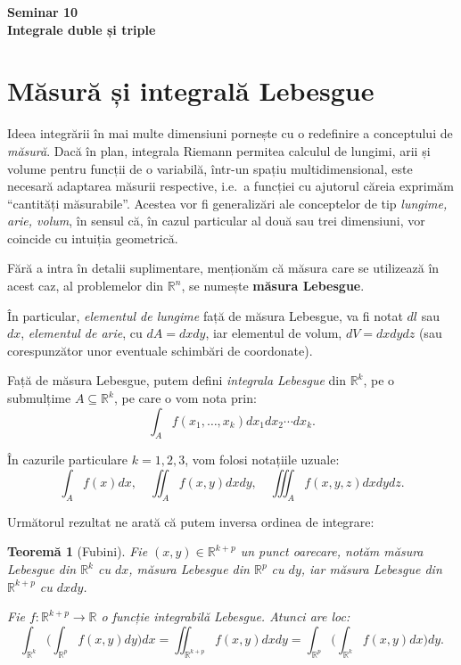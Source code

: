 \documentclass[11pt,a4paper]{article}
\newcommand\seq{\subseteq}
\newcommand\RR{\mathbb{R}}
\theoremstyle{dotless}
\newtheorem{theorem}{Teorem\u{a}}[section]
\theoremstyle{dotlessdr}
\begin{document}
\begin{center}
  {\large\textbf{Seminar 10 \\ Integrale duble și triple}}
\end{center}

\vspace{1cm}

\section{Măsură și integrală Lebesgue}
\label{sec:int-leb}

Ideea integrării în mai multe dimensiuni pornește cu o redefinire a conceptului
de \emph{măsură}. Dacă în plan, integrala Riemann permitea calculul de lungimi,
arii și volume pentru funcții de o variabilă, într-un spațiu multidimensional,
este necesară adaptarea măsurii respective, i.e.\ a funcției cu ajutorul căreia
exprimăm ``cantități măsurabile''. Acestea vor fi generalizări ale conceptelor
de tip \emph{lungime, arie, volum}, în sensul că, în cazul particular al două
sau trei dimensiuni, vor coincide cu intuiția geometrică.

Fără a intra în detalii suplimentare, menționăm că măsura care se utilizează
în acest caz, al problemelor din $\RR^n$, se numește \textbf{măsura Lebesgue}.

În particular, \emph{elementul de lungime} față de măsura Lebesgue, va fi notat
$dl$ sau $dx$, \emph{elementul de arie}, cu $dA = dx dy$, iar elementul de volum,
$dV = dxdydz$ (sau corespunzător unor eventuale schimbări de coordonate).

Față de măsura Lebesgue, putem defini \emph{integrala Lebesgue} din $\RR^k$, pe
o submulțime $A \seq \RR^k$, pe care o vom nota prin:
\[
  \int_A f(x_1, \dots, x_k) dx_1 dx_2 \cdots dx_k.
\]

În cazurile particulare $k = 1, 2, 3$, vom folosi notațiile uzuale:
\[
  \int_A f(x) dx, \quad \iint_A f(x, y) dx dy, \quad \iiint_A f(x, y, z) dx dy dz.
\]

Următorul rezultat ne arată că putem inversa ordinea de integrare:

\begin{theorem}[Fubini]\label{thm:fubini}
  Fie $(x, y) \in \RR^{k + p}$ un punct oarecare, notăm măsura Lebesgue din $\RR^k$
  cu $dx$, măsura Lebesgue din $\RR^p$ cu $dy$, iar măsura Lebesgue din $\RR^{k + p}$
  cu $dx dy$.

  Fie $f : \RR^{k + p} \to \RR$ o funcție integrabilă Lebesgue. Atunci are loc:
  \[
    \int_{\RR^k} \Big( \int_{\RR^p} f(x, y) dy \Big) dx = %
    \iint_{\RR^{k+p}} f(x, y) dx dy = %
    \int_{\RR^p} \Big( \int_{\RR^k} f(x, y) dx \Big) dy.
  \]
\end{theorem}
\end{document}
